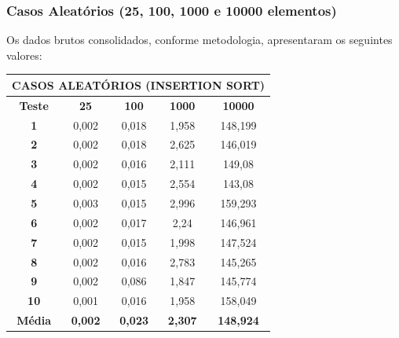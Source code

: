 \documentclass[a4paper, 12pt]{article}
\begin{document}
\subsubsection{Casos Aleatórios (25, 100, 1000 e 10000 elementos)}

\tab{ }Os dados brutos consolidados, conforme metodologia, apresentaram os seguintes valores:
\vspace{0.2cm}

\begin{minipage}{1.0\textwidth}
  \begin{minipage}[c]{0.49\textwidth}
  \centering
\begin{tabular}{ccccc}

                   \multicolumn{ 5}{c}{{\bf CASOS ALEATÓRIOS (INSERTION SORT)}} \\
\hline
{\bf Teste} &   {\bf 25} &  {\bf 100} & {\bf 1000} & {\bf 10000} \\
\hline
   {\bf 1} &      0,002 &      0,018 &      1,958 &    148,199 \\
\hline
   {\bf 2} &      0,002 &      0,018 &      2,625 &    146,019 \\
\hline
   {\bf 3} &      0,002 &      0,016 &      2,111 &     149,08 \\
\hline
   {\bf 4} &      0,002 &      0,015 &      2,554 &     143,08 \\
\hline
   {\bf 5} &      0,003 &      0,015 &      2,996 &    159,293 \\
\hline
   {\bf 6} &      0,002 &      0,017 &       2,24 &    146,961 \\
\hline
   {\bf 7} &      0,002 &      0,015 &      1,998 &    147,524 \\
\hline
   {\bf 8} &      0,002 &      0,016 &      2,783 &    145,265 \\
\hline
   {\bf 9} &      0,002 &      0,086 &      1,847 &    145,774 \\
\hline
  {\bf 10} &      0,001 &      0,016 &      1,958 &    158,049 \\
\hline
{\bf Média} & {\bf 0,002} & {\bf 0,023} & {\bf 2,307} & {\bf 148,924} \\
\hline
\end{tabular}  

  \end{minipage}
 \hfill
 \begin{minipage}[c]{0.49\textwidth}
 \centering
{}
\end{minipage}
\end{minipage}
\end{document}
